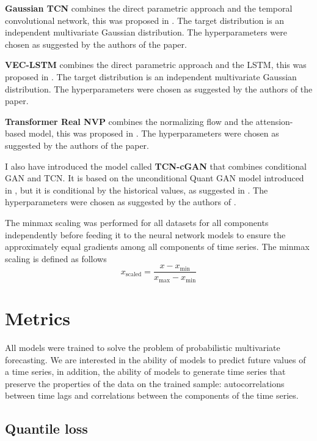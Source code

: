 \documentclass[12pt,a4paper]{article}
\begin{document}
\textbf{Gaussian TCN} combines the direct parametric approach and the temporal convolutional network, this was proposed in \cite{gaussiantcn2020}. The target distribution is an independent multivariate Gaussian distribution. The hyperparameters were chosen as suggested by the authors of the paper.

\textbf{VEC-LSTM} combines the direct parametric approach and the LSTM, this was proposed in \cite{Salinas2019HighDimensionalMF}. The target distribution is an independent multivariate Gaussian distribution. The hyperparameters were chosen as suggested by the authors of the paper.

\textbf{Transformer Real NVP} combines the normalizing flow and the attension-based model, this was proposed in \cite{normflow2021}. The hyperparameters were chosen as suggested by the authors of the paper.

I also have introduced the model called \textbf{TCN-cGAN} that combines conditional GAN and TCN. It is based on the unconditional Quant GAN model introduced in \cite{quantgan2020}, but it is conditional by the historical values, as suggested in \cite{koochali2020like}. The hyperparameters were chosen as suggested by the authors of \cite{quantgan2020}.

The minmax scaling was performed for all datasets for all components independently before feeding it to the neural network models to ensure the approximately equal gradients among all components of time series. The minmax scaling is defined as follows
$$x_\text{scaled} = \frac{x-x_{\min}}{x_{\max} - x_{\min}}$$

\section{Metrics}

All models were trained to solve the problem of probabilistic multivariate forecasting. We are interested in the ability of models to predict future values of a time series, in addition, the ability of models to generate time series that preserve the properties of the data on the trained sample: autocorrelations between time lags and correlations between the components of the time series.

\subsection{Quantile loss}
\end{document}
